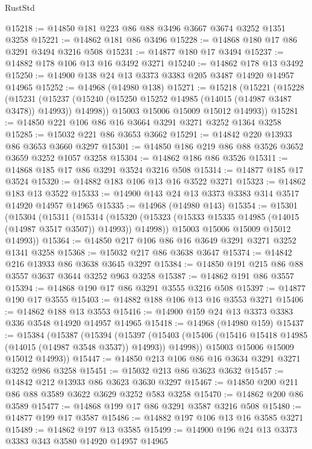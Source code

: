 \begin{lexlean}{RustStd}
\begin{coremodule}
@15218 := @14850 @181 @223 @86 @88 @3496 @3667 @3674 @3252 @1351 @3258
@15221 := @14862 @181 @86 @3496
@15228 := @14868 @180 @17 @86 @3291 @3494 @3216 @508
@15231 := @14877 @180 @17 @3494
@15237 := @14882 @178 @106 @13 @16 @3492 @3271
@15240 := @14862 @178 @13 @3492
@15250 := @14900 @138 @24 @13 @3373 @3383 @205 @3487 @14920 @14957 @14965
@15252 := @14968 (@14980 @138)
@15271 := @15218
    (@15221
      (@15228
        (@15231
          (@15237 (@15240 (@15250 @15252 @14985 (@14015 (@14987 @3487 @3478)) @14993)) @14998))
        @15003
        @15006
        @15009
        @15012
        @14993))
@15281 := @14850 @221 @106 @86 @16 @3664 @3291 @3271 @3252 @1364 @3258
@15285 := @15032 @221 @86 @3653 @3662
@15291 := @14842 @220 @13933 @86 @3653 @3660 @3297
@15301 := @14850 @186 @219 @86 @88 @3526 @3652 @3659 @3252 @1057 @3258
@15304 := @14862 @186 @86 @3526
@15311 := @14868 @185 @17 @86 @3291 @3524 @3216 @508
@15314 := @14877 @185 @17 @3524
@15320 := @14882 @183 @106 @13 @16 @3522 @3271
@15323 := @14862 @183 @13 @3522
@15333 := @14900 @143 @24 @13 @3373 @3383 @314 @3517 @14920 @14957 @14965
@15335 := @14968 (@14980 @143)
@15354 := @15301
    (@15304
      (@15311
        (@15314
          (@15320 (@15323 (@15333 @15335 @14985 (@14015 (@14987 @3517 @3507)) @14993)) @14998))
        @15003
        @15006
        @15009
        @15012
        @14993))
@15364 := @14850 @217 @106 @86 @16 @3649 @3291 @3271 @3252 @1341 @3258
@15368 := @15032 @217 @86 @3638 @3647
@15374 := @14842 @216 @13933 @86 @3638 @3645 @3297
@15384 := @14850 @191 @215 @86 @88 @3557 @3637 @3644 @3252 @963 @3258
@15387 := @14862 @191 @86 @3557
@15394 := @14868 @190 @17 @86 @3291 @3555 @3216 @508
@15397 := @14877 @190 @17 @3555
@15403 := @14882 @188 @106 @13 @16 @3553 @3271
@15406 := @14862 @188 @13 @3553
@15416 := @14900 @159 @24 @13 @3373 @3383 @336 @3548 @14920 @14957 @14965
@15418 := @14968 (@14980 @159)
@15437 := @15384
    (@15387
      (@15394
        (@15397
          (@15403 (@15406 (@15416 @15418 @14985 (@14015 (@14987 @3548 @3537)) @14993)) @14998))
        @15003
        @15006
        @15009
        @15012
        @14993))
@15447 := @14850 @213 @106 @86 @16 @3634 @3291 @3271 @3252 @986 @3258
@15451 := @15032 @213 @86 @3623 @3632
@15457 := @14842 @212 @13933 @86 @3623 @3630 @3297
@15467 := @14850 @200 @211 @86 @88 @3589 @3622 @3629 @3252 @583 @3258
@15470 := @14862 @200 @86 @3589
@15477 := @14868 @199 @17 @86 @3291 @3587 @3216 @508
@15480 := @14877 @199 @17 @3587
@15486 := @14882 @197 @106 @13 @16 @3585 @3271
@15489 := @14862 @197 @13 @3585
@15499 := @14900 @196 @24 @13 @3373 @3383 @343 @3580 @14920 @14957 @14965

\end{coremodule}
\end{lexlean}
